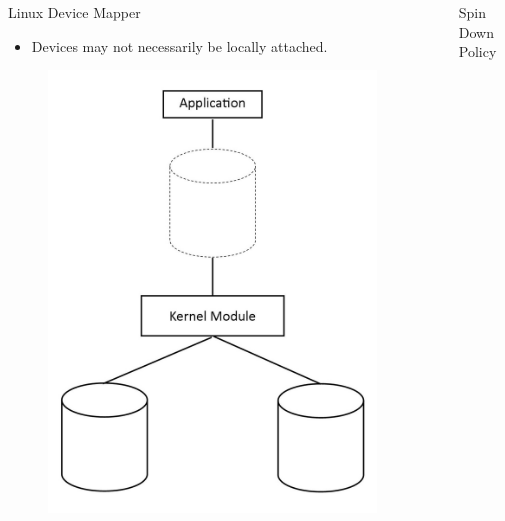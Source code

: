 \documentclass[final]{beamer}
\newlength{\sepwid}
\newlength{\onecolwid}
\newlength{\twocolwid}
\begin{document}
\begin{frame}[t]
\begin{columns}[t]
\begin{column}{\onecolwid}
\begin{block}{Linux Device Mapper}
\begin{itemize}
	            \item Devices may not necessarily be locally attached.
	        \end{itemize} %
	        \begin{figure}
	            \centering \includegraphics[scale=1]{DM.jpg}
	            \label{fig:dm}
	        \end{figure} %
	    \end{block}
	\end{column}
	\begin{column}{\sepwid}\end{column}
	\begin{column}{\twocolwid}
	    \begin{alertblock}{Spin Down Policy}

\end{alertblock}
\end{column}
\end{columns}
\end{frame}
\end{document}
